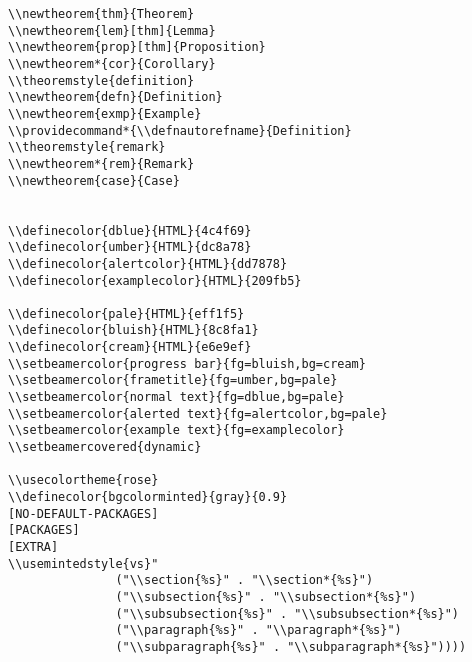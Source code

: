 \documentclass[c]{article}
\theoremstyle{plain}%
\theoremstyle{definition}
\providecommand*{\defnautorefname}{Definition}
\theoremstyle{remark}
\begin{document}
\begin{verbatim}
\\newtheorem{thm}{Theorem}
\\newtheorem{lem}[thm]{Lemma}
\\newtheorem{prop}[thm]{Proposition}
\\newtheorem*{cor}{Corollary}
\\theoremstyle{definition}
\\newtheorem{defn}{Definition}
\\newtheorem{exmp}{Example}
\\providecommand*{\\defnautorefname}{Definition}
\\theoremstyle{remark}
\\newtheorem*{rem}{Remark}
\\newtheorem{case}{Case}


\\definecolor{dblue}{HTML}{4c4f69}
\\definecolor{umber}{HTML}{dc8a78}
\\definecolor{alertcolor}{HTML}{dd7878}
\\definecolor{examplecolor}{HTML}{209fb5}

\\definecolor{pale}{HTML}{eff1f5}
\\definecolor{bluish}{HTML}{8c8fa1}
\\definecolor{cream}{HTML}{e6e9ef}
\\setbeamercolor{progress bar}{fg=bluish,bg=cream}
\\setbeamercolor{frametitle}{fg=umber,bg=pale}
\\setbeamercolor{normal text}{fg=dblue,bg=pale}
\\setbeamercolor{alerted text}{fg=alertcolor,bg=pale}
\\setbeamercolor{example text}{fg=examplecolor}
\\setbeamercovered{dynamic}

\\usecolortheme{rose}
\\definecolor{bgcolorminted}{gray}{0.9}
[NO-DEFAULT-PACKAGES]
[PACKAGES]
[EXTRA]
\\usemintedstyle{vs}"
               ("\\section{%s}" . "\\section*{%s}")
               ("\\subsection{%s}" . "\\subsection*{%s}")
               ("\\subsubsection{%s}" . "\\subsubsection*{%s}")
               ("\\paragraph{%s}" . "\\paragraph*{%s}")
               ("\\subparagraph{%s}" . "\\subparagraph*{%s}"))))
\end{verbatim}
\end{document}
